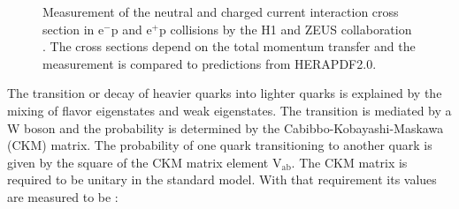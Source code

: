 \begin{figure}[htbp!]
  \begin{center}

\caption{Measurement of the neutral and charged current interaction cross section in $\mathrm{e}^-$p and $\mathrm{e}^+$p collisions by the H1 and ZEUS collaboration \cite{Abramowicz:2015mha}.
The cross sections depend on the total momentum transfer and the measurement is compared to predictions from HERAPDF2.0.
  \label{fig:theo_ew}}
  \end{center}
\end{figure}

The transition or decay of heavier quarks into lighter quarks is explained by the mixing of flavor eigenstates and weak eigenstates. The transition is mediated by a W boson and the 
probability is determined by the Cabibbo-Kobayashi-Maskawa (CKM) matrix. The probability of one quark transitioning to another quark is given by the square of the CKM matrix element $\mathrm{V}_{\mathrm{ab}}$.
The CKM matrix is required to be unitary in the standard model. With that requirement its values are measured to be \cite{Olive:2016xmw}:
 
